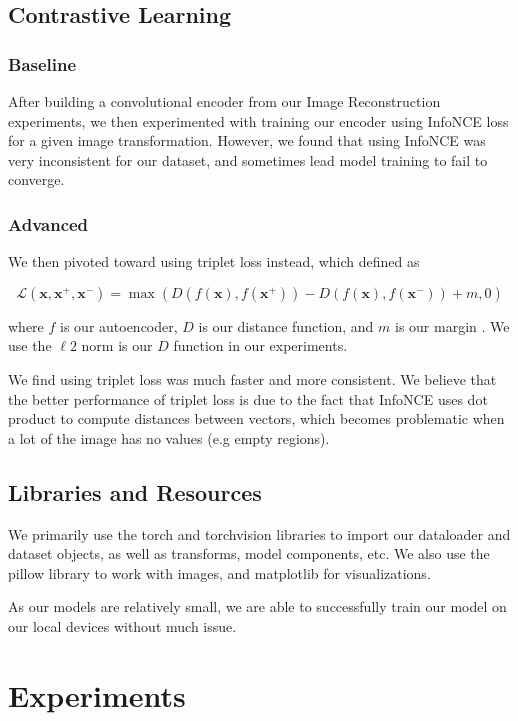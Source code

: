 \documentclass{article}
\begin{document}
\subsection{Contrastive Learning}

\subsubsection{Baseline}
After building a convolutional encoder from our Image Reconstruction experiments, we then experimented with training our encoder using InfoNCE loss for a given image transformation. However, we found that using InfoNCE was very inconsistent for our dataset, and sometimes lead model training to fail to converge. 

\subsubsection{Advanced}

We then pivoted toward using triplet loss instead, which defined as 

\[ \mathcal{L} (\textbf{x}, \textbf{x}^+, \textbf{x}^-) = \max(D(f(\textbf{x}), f(\textbf{x}^+)) - D(f(\textbf{x}), f(\textbf{x}^-)) + m, 0) \]

where $f$ is our autoencoder, $D$ is our distance function, and $m$ is our margin \cite{foundationsCVbook}. We use the $\ell2$ norm is our $D$ function in our experiments.

We find using triplet loss was much faster and more consistent. We believe that the better performance of triplet loss is due to the fact that InfoNCE uses dot product to compute distances between vectors, which becomes problematic when a lot of the image has no values (e.g empty regions).

\subsection{Libraries and Resources}

We primarily use the torch and torchvision libraries to import our dataloader and dataset objects, as well as transforms, model components, etc. We also use the pillow library to work with images, and matplotlib for visualizations.

As our models are relatively small, we are able to successfully train our model on our local devices without much issue.

\section{Experiments}
\end{document}
